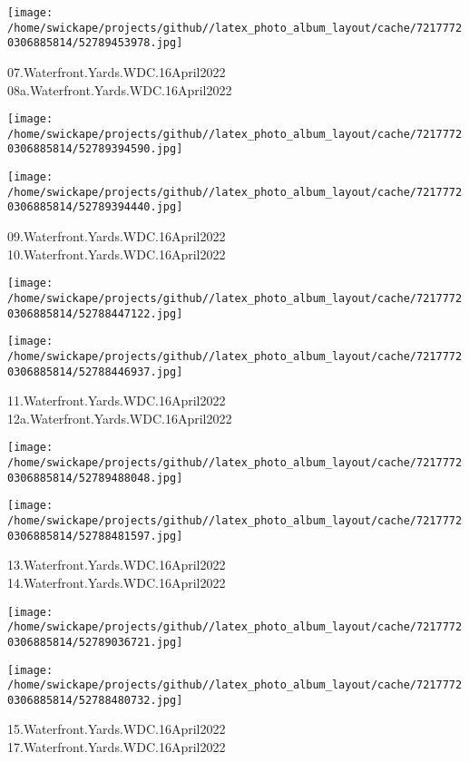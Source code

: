 \documentclass[10pt,letterpaper]{article}
\begin{document}
\vspace{0.25in}
\texttt{[image: /home/swickape/projects/github//latex\_photo\_album\_layout/cache/72177720306885814/52789453978.jpg]}

07.Waterfront.Yards.WDC.16April2022\\
08a.Waterfront.Yards.WDC.16April2022
\pagebreak

\texttt{[image: /home/swickape/projects/github//latex\_photo\_album\_layout/cache/72177720306885814/52789394590.jpg]}

\vspace{0.25in}
\texttt{[image: /home/swickape/projects/github//latex\_photo\_album\_layout/cache/72177720306885814/52789394440.jpg]}

09.Waterfront.Yards.WDC.16April2022\\
10.Waterfront.Yards.WDC.16April2022
\pagebreak

\texttt{[image: /home/swickape/projects/github//latex\_photo\_album\_layout/cache/72177720306885814/52788447122.jpg]}

\vspace{0.25in}
\texttt{[image: /home/swickape/projects/github//latex\_photo\_album\_layout/cache/72177720306885814/52788446937.jpg]}

11.Waterfront.Yards.WDC.16April2022\\
12a.Waterfront.Yards.WDC.16April2022
\pagebreak

\texttt{[image: /home/swickape/projects/github//latex\_photo\_album\_layout/cache/72177720306885814/52789488048.jpg]}

\vspace{0.25in}
\texttt{[image: /home/swickape/projects/github//latex\_photo\_album\_layout/cache/72177720306885814/52788481597.jpg]}

13.Waterfront.Yards.WDC.16April2022\\
14.Waterfront.Yards.WDC.16April2022
\pagebreak

\texttt{[image: /home/swickape/projects/github//latex\_photo\_album\_layout/cache/72177720306885814/52789036721.jpg]}

\vspace{0.25in}
\texttt{[image: /home/swickape/projects/github//latex\_photo\_album\_layout/cache/72177720306885814/52788480732.jpg]}

15.Waterfront.Yards.WDC.16April2022\\
17.Waterfront.Yards.WDC.16April2022
\pagebreak
\end{document}

